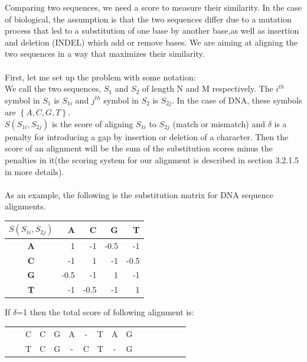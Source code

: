 \documentclass[11pt,a4paper]{report}
\begin{document}
Comparing two sequences, we need a score to measure their similarity.
In the case of biological, the assumption is that the two sequences differ
due to a mutation process that led to a substitution 
of one base by another base,as well as insertion and deletion (INDEL) which add or remove bases.
We are aiming at aligning the two sequences in a way that maximizes their similarity.\\ \\
First, let me set up the problem with some notation:\\
We call the two sequences, $S_{1}$ and $S_{2}$ of length N and M respectively. 
The $i^{th}$ symbol in $S_{1}$ is $S_{1i}$ and $j^{th}$ symbol in $S_{2}$ is $S_{2j}$. 
In the case of DNA, these symbols are $\left\{A, C, G, T\right\}$.\\
$S(S_{1i}, S_{2j})$ is the score of aligning $S_{1i}$ to $S_{2j}$ (match or mismatch)
and $\delta$ is a penalty for introducing a gap by insertion or deletion of a character. 
Then the score of an alignment will be the sum of the substitution scores minus the 
penalties in it(the scoring system for our alignment is described in section 3.2.1.5 in more details).\\\\
As an example, the following is the substitution matrix for DNA sequence alignments.


\begin{table}[H]
 \centering
  \begin{tabular}{  c| r  r r  r }
    
  \textbf{  $S(S_{1i}, S_{2j})$ } & \textbf{A} &\textbf{ C} &\textbf{ G} &\textbf{ T} \\ \hline
       \textbf{A} &  1  & -1 & -0.5 & -1 \\
       \textbf{C} & -1  & 1 & -1 & -0.5 \\ 
       \textbf{G} & -0.5 & -1 & 1 & -1 \\ 
       \textbf{T} & -1 & -0.5 & -1 & 1
    \end{tabular}
\label{alignment-exp}
\end{table}

If $\delta$=1 then the total score of following alignment is:
 
\begin{center}
	\begin{tabular}{c *{12}cccc}
        & & C & C & G & A & - & T & A & G && \\
 	  & & T  & C & G &  -  & C   &  T & -  & G & \\
    	                                 
	\end{tabular}
\end{center} 
\end{document}
